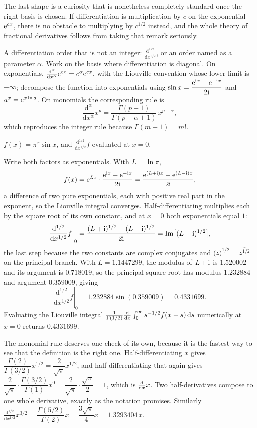 The last shape is a curiosity that is nonetheless completely standard once the right basis is chosen. If differentiation is multiplication by $c$ on the exponential $\mathrm{e}^{cx}$, there is no obstacle to multiplying by $c^{1/2}$ instead, and the whole theory of fractional derivatives follows from taking that remark seriously.

\cue A differentiation order that is not an integer: $\frac{\mathrm{d}^{1/2}}{\mathrm{d}x^{1/2}}$, or an order named as a parameter $\alpha$.
\method Work on the basis where differentiation is diagonal. On exponentials, $\frac{\mathrm{d}^{\alpha}}{\mathrm{d}x^{\alpha}}\mathrm{e}^{cx}=c^{\alpha}\mathrm{e}^{cx}$, with the Liouville convention whose lower limit is $-\infty$; decompose the function into exponentials using $\sin x=\dfrac{\mathrm{e}^{\mathrm{i} x}-\mathrm{e}^{-\mathrm{i} x}}{2\mathrm{i}}$ and $a^{x}=\mathrm{e}^{x\ln a}$. On monomials the corresponding rule is
\[
\frac{\mathrm{d}^{\alpha}}{\mathrm{d}x^{\alpha}}x^{p}=\frac{\Gamma(p+1)}{\Gamma(p-\alpha+1)}\,x^{p-\alpha},
\]
which reproduces the integer rule because $\Gamma(m+1)=m!$.

\begin{worked}
$f(x)=\pi^{x}\sin x$, and $\frac{\mathrm{d}^{1/2}}{\mathrm{d}x^{1/2}}f$ evaluated at $x=0$.

Write both factors as exponentials. With $L=\ln\pi$,
\[
f(x)=\mathrm{e}^{Lx}\cdot\frac{\mathrm{e}^{\mathrm{i} x}-\mathrm{e}^{-\mathrm{i} x}}{2\mathrm{i}}=\frac{\mathrm{e}^{(L+\mathrm{i})x}-\mathrm{e}^{(L-\mathrm{i})x}}{2\mathrm{i}},
\]
a difference of two pure exponentials, each with positive real part in the exponent, so the Liouville integral converges. Half-differentiating multiplies each by the square root of its own constant, and at $x=0$ both exponentials equal $1$:
\[
\left.\frac{\mathrm{d}^{1/2}}{\mathrm{d}x^{1/2}}f\right|_{0}=\frac{(L+\mathrm{i})^{1/2}-(L-\mathrm{i})^{1/2}}{2\mathrm{i}}=\operatorname{Im}\bigl[(L+\mathrm{i})^{1/2}\bigr],
\]
the last step because the two constants are complex conjugates and $\bigl(\bar z\bigr)^{1/2}=\overline{z^{1/2}}$ on the principal branch. With $L=1.1447299$, the modulus of $L+\mathrm{i}$ is $1.520002$ and its argument is $0.718019$, so the principal square root has modulus $1.232884$ and argument $0.359009$, giving
\[
\left.\frac{\mathrm{d}^{1/2}}{\mathrm{d}x^{1/2}}f\right|_{0}=1.232884\sin(0.359009)=0.4331699 .
\]
Evaluating the Liouville integral $\frac{1}{\Gamma(1/2)}\frac{\mathrm{d}}{\mathrm{d}x}\int_{0}^{\infty}s^{-1/2}f(x-s)\,\mathrm{d} s$ numerically at $x=0$ returns $0.4331699$.

The monomial rule deserves one check of its own, because it is the fastest way to see that the definition is the right one. Half-differentiating $x$ gives $\dfrac{\Gamma(2)}{\Gamma(3/2)}x^{1/2}=\dfrac{2}{\sqrt\pi}x^{1/2}$, and half-differentiating that again gives $\dfrac{2}{\sqrt\pi}\cdot\dfrac{\Gamma(3/2)}{\Gamma(1)}x^{0}=\dfrac{2}{\sqrt\pi}\cdot\dfrac{\sqrt\pi}{2}=1$, which is $\frac{\mathrm{d}}{\mathrm{d}x}x$. Two half-derivatives compose to one whole derivative, exactly as the notation promises. Similarly $\frac{\mathrm{d}^{1/2}}{\mathrm{d}x^{1/2}}x^{3/2}=\dfrac{\Gamma(5/2)}{\Gamma(2)}x=\dfrac{3\sqrt\pi}{4}x=1.3293404\,x$.
\end{worked}


